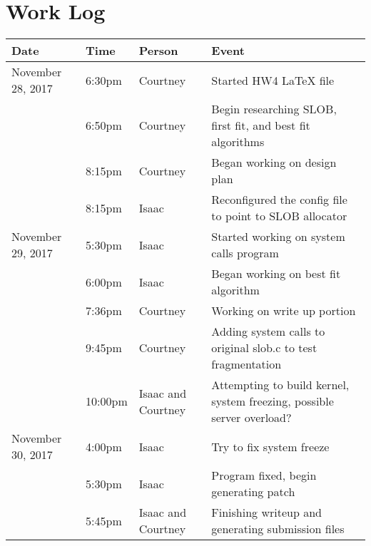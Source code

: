 \documentclass[letterpaper,10pt,draftclsnofoot,onecolumn,titlepage]{IEEEtran}
\begin{document}
\section{Work Log}
\begin{center}
\begin{tabular}{p{3cm}p{1cm}p{2cm}p{10cm} }
 Date  & Time & Person & Event \\ \hline
November 28, 2017 & 6:30pm & Courtney & Started HW4 LaTeX file \\
		  & 6:50pm & Courtney & Begin researching SLOB, first fit, and best fit algorithms \\
		  & 8:15pm & Courtney & Began working on design plan \\
		  & 8:15pm & Isaac & Reconfigured the config file to point to SLOB allocator \\
November 29, 2017 & 5:30pm & Isaac & Started working on system calls program \\
		  & 6:00pm & Isaac & Began working on best fit algorithm \\
		  & 7:36pm & Courtney & Working on write up portion\\
		  & 9:45pm & Courtney & Adding system calls to original slob.c to test fragmentation \\
		  & 10:00pm & Isaac and Courtney & Attempting to build kernel, system freezing, possible server overload? \\
November 30, 2017 & 4:00pm & Isaac & Try to fix system freeze \\
   		  & 5:30pm & Isaac & Program fixed, begin generating patch \\
   		  & 5:45pm & Isaac and Courtney & Finishing writeup and generating submission files \\
\end{tabular}
\end{center}
\end{document}
